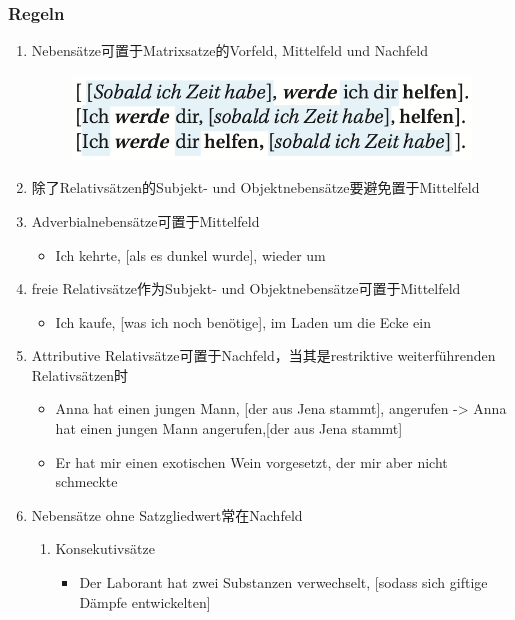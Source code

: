 \documentclass[UTF8]{report}
\begin{document}
\subsubsection{Regeln}
\begin{enumerate}
    \item Nebensätze可置于Matrixsatze的Vorfeld, Mittelfeld und Nachfeld
    \begin{figure}[H]
        \centering
        \includegraphics[scale=0.5]{gz1.png}
    \end{figure}
    \item 除了Relativsätzen的Subjekt- und Objektnebensätze要避免置于Mittelfeld
    \item Adverbialnebensätze可置于Mittelfeld
    \begin{itemize}
        \item Ich kehrte, [als es dunkel wurde], wieder um
    \end{itemize}
    \item freie Relativsätze作为Subjekt- und Objektnebensätze可置于Mittelfeld
    \begin{itemize}
        \item Ich kaufe, [was ich noch benötige], im Laden um die Ecke ein
    \end{itemize}
    \item Attributive Relativsätze可置于Nachfeld，当其是restriktive weiterführenden Relativsätzen时
    \begin{itemize}
        \item Anna hat einen jungen Mann, [der aus Jena stammt], angerufen ->
        Anna hat einen jungen Mann angerufen,[der aus Jena stammt]
        \item Er hat mir einen exotischen Wein vorgesetzt, der mir aber nicht schmeckte
    \end{itemize}
    \item Nebensätze ohne Satzgliedwert常在Nachfeld
    \begin{enumerate}
        \item Konsekutivsätze
        \begin{itemize}
            \item Der Laborant hat zwei Substanzen verwechselt, [sodass sich giftige Dämpfe entwickelten] 

\end{itemize}
\end{enumerate}
\end{enumerate}
\end{document}
